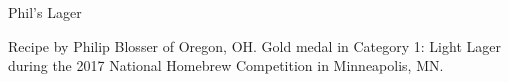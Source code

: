 \begin{recipe}{Phil's Lager}

\begin{aboutblock}
Recipe by Philip Blosser of Oregon, OH. Gold medal in Category 1: Light Lager
during the 2017 National Homebrew Competition in Minneapolis, MN. \sourceaha
\end{aboutblock}


\begin{methodandtiming}
  
\begin{mashsteps}
\end{mashsteps}

\begin{fermentationsteps}
\end{fermentationsteps}

\end{methodandtiming}

\recipebreak

\begin{ingredientsblock}

\begin{malts}
\end{malts}

\begin{hops}
\end{hops}


\end{ingredientsblock}

\end{recipe}

